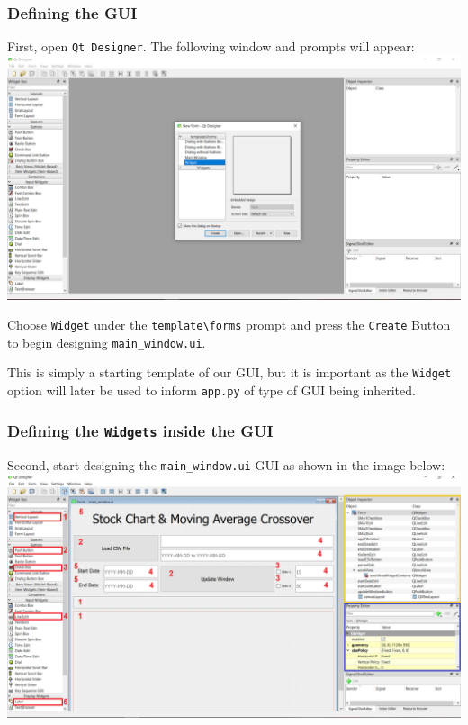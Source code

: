 \documentclass[11pt]{article}
\begin{document}
    \hypertarget{defining-the-gui}{%
\subsubsection{Defining the GUI}\label{defining-the-gui}}

First, open \texttt{Qt\ Designer}. The following window and prompts will
appear: \includegraphics{../asset/img/qt-designer.png}

Choose \texttt{Widget} under the \texttt{template\textbackslash{}forms}
prompt and press the \texttt{Create} Button to begin designing
\texttt{main\_window.ui}.

This is simply a starting template of our GUI, but it is important as
the \texttt{Widget} option will later be used to inform \texttt{app.py}
of type of GUI being inherited.

    \hypertarget{defining-the-widgets-inside-the-gui}{%
\subsubsection{\texorpdfstring{Defining the \texttt{Widgets} inside the
GUI}{Defining the Widgets inside the GUI}}\label{defining-the-widgets-inside-the-gui}}

Second, start designing the \texttt{main\_window.ui} GUI as shown in the
image below: \includegraphics{../asset/img/qt-designer-gui.png}
\end{document}
